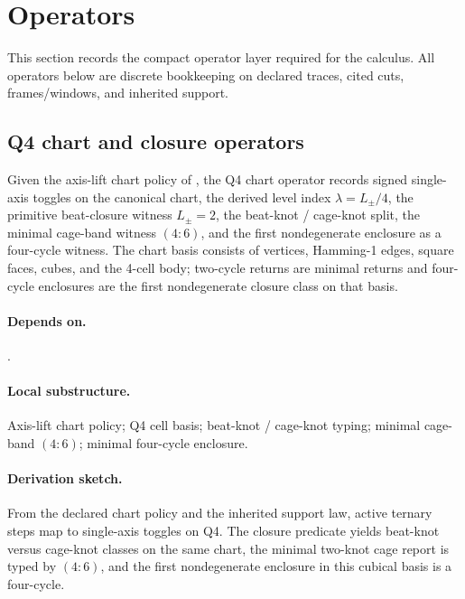 \section{Operators}

This section records the compact operator layer required for the calculus. All operators below are discrete bookkeeping on declared traces, cited cuts, frames/windows, and inherited support.

\subsection{Q4 chart and closure operators}\label{subsec:q4-closure-operators}
\begin{definition}
\label{def:q4-closure-operator}
Given the axis-lift chart policy of , the Q4 chart operator records signed single-axis toggles on the canonical chart, the derived level index $\lambda=L_{\pm}/4$, the primitive beat-closure witness $L_{\pm}=2$, the beat-knot / cage-knot split, the minimal cage-band witness $(4{:}6)$, and the first nondegenerate enclosure as a four-cycle witness. The chart basis consists of vertices, Hamming-1 edges, square faces, cubes, and the 4-cell body; two-cycle returns are minimal returns and four-cycle enclosures are the first nondegenerate closure class on that basis.
\end{definition}

\paragraph{Depends on.} .
\paragraph{Local substructure.} Axis-lift chart policy; Q4 cell basis; beat-knot / cage-knot typing; minimal cage-band $(4{:}6)$; minimal four-cycle enclosure.
\paragraph{Derivation sketch.} From the declared chart policy and the inherited support law, active ternary steps map to single-axis toggles on Q4. The closure predicate yields beat-knot versus cage-knot classes on the same chart, the minimal two-knot cage report is typed by $(4{:}6)$, and the first nondegenerate enclosure in this cubical basis is a four-cycle.

